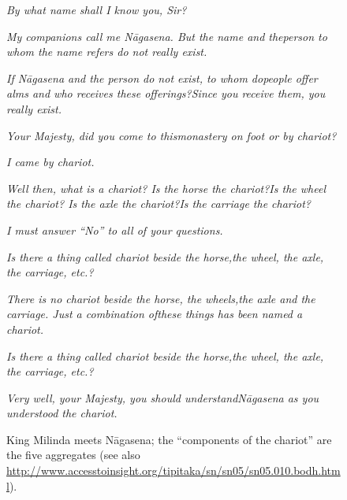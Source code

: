 \begin{figure}[H]
\begin{quoting}
\topsep=0pt
\begin{flushleft}
\textit{By what name shall I know you, Sir?}
\end{flushleft}
\begin{flushright}
\textit{My companions call me Nāgasena. But the name and the\linebreak person to whom the name refers do not really exist.}
\end{flushright}
\begin{flushleft}
\textit{If Nāgasena and the person do not exist, to whom do\linebreak people offer alms and who receives these offerings?\linebreak Since you receive them, you really exist.}
\end{flushleft}
\begin{flushright}
\textit{Your Majesty, did you come to this\linebreak monastery on foot or by chariot?}
\end{flushright}
\begin{flushleft}
\textit{I came by chariot.}
\end{flushleft}
\begin{flushright}
\textit{Well then, what is a chariot? Is the horse the chariot?\linebreak Is the wheel the chariot? Is the axle the chariot?\linebreak Is the carriage the chariot?}
\end{flushright}
\begin{flushleft}
\textit{I must answer “No” to all of your questions.}
\end{flushleft}
\begin{flushright}
\textit{Is there a thing called chariot beside the horse,\linebreak the wheel, the axle, the carriage, etc.?}
\end{flushright}
\begin{flushleft}
\textit{There is no chariot beside the horse, the wheels,\linebreak the axle and the carriage. Just a combination of\linebreak these things has been named a chariot.}
\end{flushleft}
\begin{flushright}
\textit{Is there a thing called chariot beside the horse,\linebreak the wheel, the axle, the carriage, etc.?}
\end{flushright}
\begin{flushleft}
\textit{Very well, your Majesty, you should understand\linebreak Nāgasena as you understood the chariot.}
\end{flushleft}
\end{quoting}

\caption{King Milinda meets Nāgasena; the “components of the chariot” are the five aggregates (see also \url{http://www.accesstoinsight.org/tipitaka/sn/sn05/sn05.010.bodh.html}). }
\label{fig:Milinda}
\end{figure}

